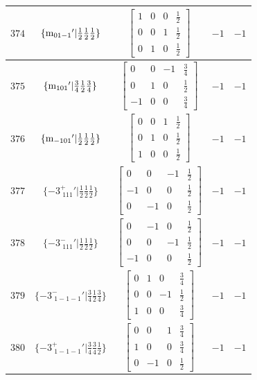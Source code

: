 \documentclass[fleqn,8pt]{jsarticle}
\begin{document}
\begin{longtable}{ccccc}
$ 374 $ & $ \{{\rm m}_{01-1}{}'|\frac{1}{2} \frac{1}{2} \frac{1}{2}\} $ & $ \begin{bmatrix} 1 & 0 & 0 & \frac{1}{2} \\ 0 & 0 & 1 & \frac{1}{2} \\ 0 & 1 & 0 & \frac{1}{2} \end{bmatrix} $ & $ -1 $ & $ -1 $ \\ \hline
$ 375 $ & $ \{{\rm m}_{101}{}'|\frac{3}{4} \frac{1}{2} \frac{3}{4}\} $ & $ \begin{bmatrix} 0 & 0 & -1 & \frac{3}{4} \\ 0 & 1 & 0 & \frac{1}{2} \\ -1 & 0 & 0 & \frac{3}{4} \end{bmatrix} $ & $ -1 $ & $ -1 $ \\ \hline
$ 376 $ & $ \{{\rm m}_{-101}{}'|\frac{1}{2} \frac{1}{2} \frac{1}{2}\} $ & $ \begin{bmatrix} 0 & 0 & 1 & \frac{1}{2} \\ 0 & 1 & 0 & \frac{1}{2} \\ 1 & 0 & 0 & \frac{1}{2} \end{bmatrix} $ & $ -1 $ & $ -1 $ \\ \hline
$ 377 $ & $ \{-3^{+}_{\,\,111}{}'|\frac{1}{2} \frac{1}{2} \frac{1}{2}\} $ & $ \begin{bmatrix} 0 & 0 & -1 & \frac{1}{2} \\ -1 & 0 & 0 & \frac{1}{2} \\ 0 & -1 & 0 & \frac{1}{2} \end{bmatrix} $ & $ -1 $ & $ -1 $ \\ \hline
$ 378 $ & $ \{-3^{-}_{\,\,111}{}'|\frac{1}{2} \frac{1}{2} \frac{1}{2}\} $ & $ \begin{bmatrix} 0 & -1 & 0 & \frac{1}{2} \\ 0 & 0 & -1 & \frac{1}{2} \\ -1 & 0 & 0 & \frac{1}{2} \end{bmatrix} $ & $ -1 $ & $ -1 $ \\ \hline
$ 379 $ & $ \{-3^{-}_{\,\,1-1-1}{}'|\frac{3}{4} \frac{1}{2} \frac{3}{4}\} $ & $ \begin{bmatrix} 0 & 1 & 0 & \frac{3}{4} \\ 0 & 0 & -1 & \frac{1}{2} \\ 1 & 0 & 0 & \frac{3}{4} \end{bmatrix} $ & $ -1 $ & $ -1 $ \\ \hline
$ 380 $ & $ \{-3^{+}_{\,\,1-1-1}{}'|\frac{3}{4} \frac{3}{4} \frac{1}{2}\} $ & $ \begin{bmatrix} 0 & 0 & 1 & \frac{3}{4} \\ 1 & 0 & 0 & \frac{3}{4} \\ 0 & -1 & 0 & \frac{1}{2} \end{bmatrix} $ & $ -1 $ & $ -1 $ \\ \hline

\end{longtable}
\end{document}
